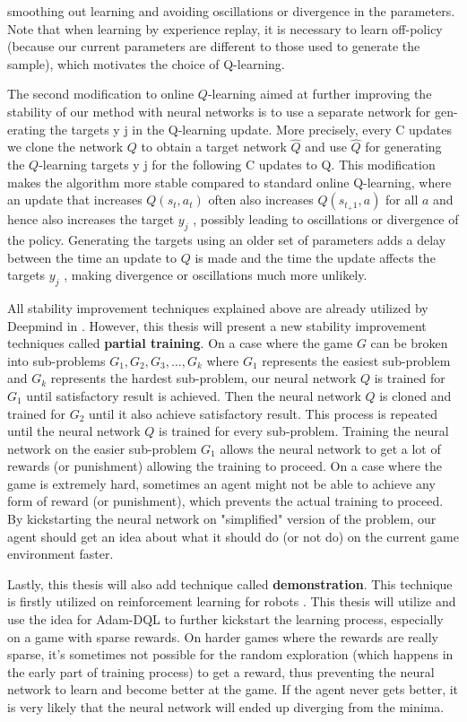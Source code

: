     smoothing out learning and avoiding oscillations or divergence in the parameters.
    Note that when learning by experience replay, it is necessary to learn off-policy
    (because our current parameters are different to those used to generate the sample), which motivates the choice of Q-learning.
    \par
    The second modification to online $Q$-learning aimed at further improving the
    stability of our method with neural networks is to use a separate network for gen-
    erating the targets y j in the Q-learning update. More precisely, every C updates we
    clone the network $Q$ to obtain a target network $\hat{Q}$ and use $\hat{Q}$
    for generating the $Q$-learning targets y j for the following C updates to Q. This modification makes the
    algorithm more stable compared to standard online Q-learning, where an update
    that increases $Q(s_t ,a_t )$ often also increases $Q(s_{t_+1} ,a)$ for all $a$ and hence also increases
    the target $y_j$ , possibly leading to oscillations or divergence of the policy. Generating
    the targets using an older set of parameters adds a delay between the time an update
    to $Q$ is made and the time the update affects the targets $y_j$ , making divergence or oscillations much more unlikely.
    \par
    All stability improvement techniques explained above are already utilized by Deepmind in \cite{mnih2015humanlevel}. However, this thesis will present a new stability improvement techniques called \textbf{partial training}. On a case where the game $G$ can be broken into sub-problems $G_1, G_2, G_3, ...,G_k$ where $G_1$ represents the easiest sub-problem and $G_k$ represents the hardest sub-problem, our neural network $Q$ is trained for $G_1$ until satisfactory result is achieved. Then the neural network $Q$ is cloned and trained for $G_2$ until it also achieve satisfactory result. This process is repeated until the neural network $Q$ is trained for every sub-problem. Training the neural network on the easier sub-problem $G_1$ allows the neural network to get a lot of rewards (or punishment) allowing the training to proceed. On a case where the game is extremely hard, sometimes an agent might not be able to achieve any form of reward (or punishment), which prevents the actual training to proceed. By kickstarting the neural network on "simplified" version of the problem, our agent should get an idea about what it should do (or not do) on the current game environment faster.
    \par
    Lastly, this thesis will also add technique called \textbf{demonstration}. This technique is firstly utilized on reinforcement learning for robots \cite{DBLP:journals/corr/abs-1709-10089}. This thesis will utilize and use the idea for Adam-DQL to further kickstart the learning process, especially on a game with sparse rewards. On harder games where the rewards are really sparse, it's sometimes not possible for the random exploration (which happens in the early part of training process) to get a reward, thus preventing the neural network to learn and become better at the game. If the agent never gets better, it is very likely that the neural network will ended up diverging from the minima.
